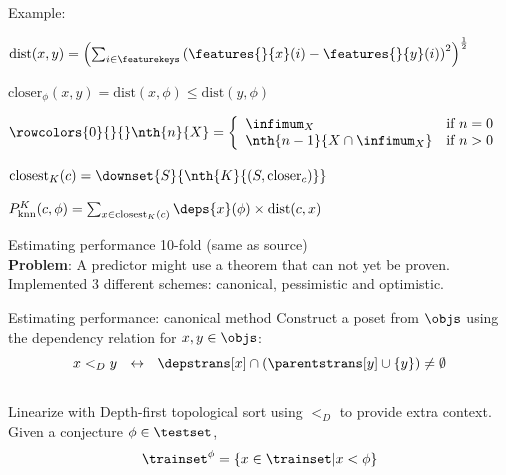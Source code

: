 \documentclass[department=ds, notes={hide notes}, slidesperpage=1]{beamerruhuisstijl}
\begin{document}
\begin{frame}{Example: \knn}
	\begin{definition}
		$ \text{dist}(x, y) = \left( \sum_{i \in \featurekeys} \left( \features{}{x}(i) - \features{}{y}(i) \right)^2 \right)^{\frac{1}{2}} $
	\end{definition}
	\bigskip
	\begin{definition}
	$ \text{closer}_\phi(x, y) = \text{dist}(x, \phi) \leq \text{dist}(y, \phi) $
	\end{definition}
	\bigskip
	\begin{definition}
	$
	\rowcolors{0}{}{}
    \nth{n}{X} = \left\{
      \begin{array}{ll}
        \infimum_X & \text{if}~n = 0 \\
        \nth{n-1}{X \cap \infimum_X} & \text{if}~n > 0 \\
      \end{array}
    \right.
	$
	\end{definition}
	\bigskip
	\begin{definition}
	$
    \text{closest}_K(c) = \downset{S}{\nth{K}{(S, \text{closer}_c)}}
	$
	\end{definition}
	\pause
	\bigskip
	\begin{definition}[\knn]
	$
    	P^K_\text{knn}(c, \phi) = \sum_{x \in \text{closest}_K(c)} \deps{x}(\phi) \times \text{dist}(c, x)
	$
	\end{definition}
\end{frame}

\begin{frame}{Estimating performance}
	10-fold \crossvalidation (same as source)\\
	\bigskip
	\textbf{Problem}: A predictor might use a theorem that can not yet be proven.\\
	\bigskip
	Implemented 3 different schemes: canonical, pessimistic and optimistic.
\end{frame}

\begin{frame}{Estimating performance: canonical method}
	Construct a poset from $\objs$ using the dependency relation for $x, y \in \objs$:
	\[ x <_D y ~~\leftrightarrow~~ \depstrans[x] \cap (\parentstrans[y] \cup \{y\}) \neq \emptyset \]\\
	Linearize with Depth-first topological sort using $<_D$ to provide extra context.\\
	\bigskip
	Given a conjecture $\phi \in \testset$,
	\[ \trainset^{\phi} = \{ x \in \trainset | x < \phi \} \]
\end{frame}
\end{document}
